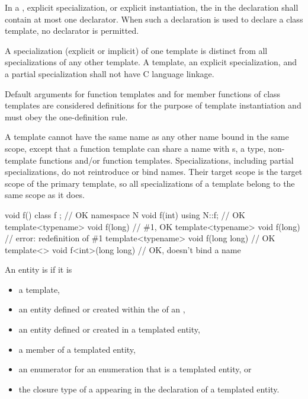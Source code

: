\pnum
In a
,
explicit specialization, or explicit instantiation, the
in the declaration shall contain at most one declarator.
When such a declaration is used to declare a class template,
no declarator is permitted.

\pnum
{}%
A specialization (explicit or implicit) of one template is
distinct from all specializations of any other template.
A template, an explicit specialization, and a
partial specialization shall not have C language linkage.
\begin{note}
Default arguments for function templates and for member functions of
class templates are considered definitions for the purpose of template
instantiation and must obey the one-definition rule.
\end{note}

\pnum
\begin{note}
A template cannot have the same name as any other
name bound in the same scope, except
that a function template can share a name with s,
a type, non-template functions and/or function templates.
Specializations, including partial specializations,
do not reintroduce or bind names.
Their target scope is the target scope of the primary template,
so all specializations of a template belong to the same scope as it does.
\begin{example}
\begin{codeblock}
void f() {}
class f {};                                     // OK
namespace N {
  void f(int) {}
}
using N::f;                                     // OK
template<typename> void f(long) {}              // \#1, OK
template<typename> void f(long) {}              // error: redefinition of \#1
template<typename> void f(long long) {}         // OK
template<>         void f<int>(long long) {}    // OK, doesn't bind a name
\end{codeblock}
\end{example}
\end{note}

\pnum
{}%
An entity is 
if it is
\begin{itemize}
\item a template,
\item an entity defined or created
      within the 
      of an ,
\item an entity defined or created in a templated entity,
\item a member of a templated entity,
\item an enumerator for an enumeration that is a templated entity, or
\item the closure type of a 
      appearing in the declaration of a templated entity.
\end{itemize}


